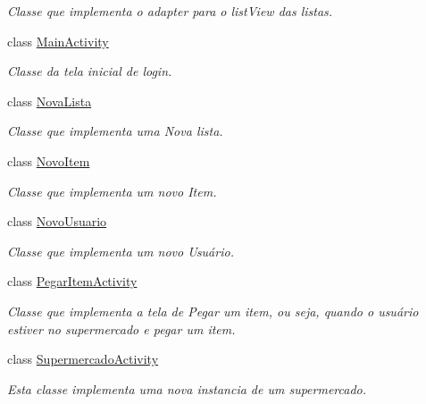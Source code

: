 \begin{DoxyCompactItemize}
\begin{DoxyCompactList}\small\item\em Classe que implementa o adapter para o list\+View das listas. \end{DoxyCompactList}\item 
class \mbox{\hyperlink{classbr_1_1unb_1_1cic_1_1mp_1_1marketmaster_1_1MainActivity}{Main\+Activity}}
\begin{DoxyCompactList}\small\item\em Classe da tela inicial de login. \end{DoxyCompactList}\item 
class \mbox{\hyperlink{classbr_1_1unb_1_1cic_1_1mp_1_1marketmaster_1_1NovaLista}{Nova\+Lista}}
\begin{DoxyCompactList}\small\item\em Classe que implementa uma Nova lista. \end{DoxyCompactList}\item 
class \mbox{\hyperlink{classbr_1_1unb_1_1cic_1_1mp_1_1marketmaster_1_1NovoItem}{Novo\+Item}}
\begin{DoxyCompactList}\small\item\em Classe que implementa um novo Item. \end{DoxyCompactList}\item 
class \mbox{\hyperlink{classbr_1_1unb_1_1cic_1_1mp_1_1marketmaster_1_1NovoUsuario}{Novo\+Usuario}}
\begin{DoxyCompactList}\small\item\em Classe que implementa um novo Usuário. \end{DoxyCompactList}\item 
class \mbox{\hyperlink{classbr_1_1unb_1_1cic_1_1mp_1_1marketmaster_1_1PegarItemActivity}{Pegar\+Item\+Activity}}
\begin{DoxyCompactList}\small\item\em Classe que implementa a tela de Pegar um item, ou seja, quando o usuário estiver no supermercado e pegar um item. \end{DoxyCompactList}\item 
class \mbox{\hyperlink{classbr_1_1unb_1_1cic_1_1mp_1_1marketmaster_1_1SupermercadoActivity}{Supermercado\+Activity}}
\begin{DoxyCompactList}\small\item\em Esta classe implementa uma nova instancia de um supermercado. \end{DoxyCompactList}\end{DoxyCompactItemize}
